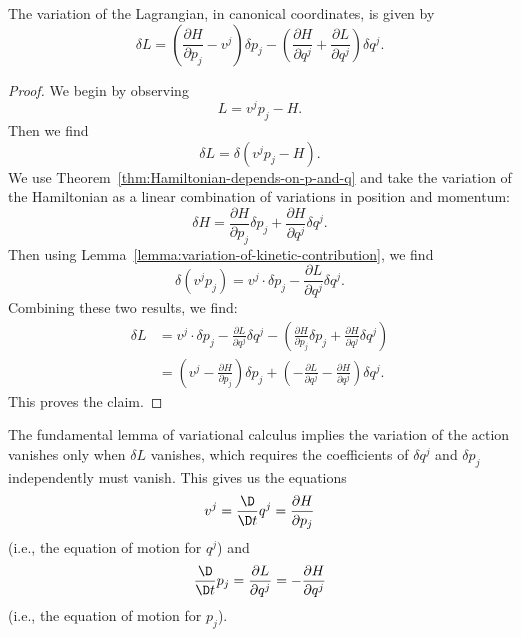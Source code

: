 \begin{theorem}
  The variation of the Lagrangian, in canonical coordinates, is given by
  \begin{equation}
\delta L = \left(\frac{\partial H}{\partial p_{j}}-v^{j}\right)\delta p_{j} -
\left(\frac{\partial H}{\partial q^{j}} + \frac{\partial L}{\partial q^{j}}\right)\delta q^{j}.
  \end{equation}
\end{theorem}

\begin{proof}
  We begin by observing
  \begin{equation}
L = v^{j}p_{j} - H.
  \end{equation}
  Then we find
  \begin{equation}
\delta L = \delta(v^{j}p_{j} - H).
  \end{equation}
  We use Theorem~\ref{thm:Hamiltonian-depends-on-p-and-q} and take the variation of the Hamiltonian as a linear combination of
  variations in position and momentum:
  \begin{equation}
\delta H = \frac{\partial H}{\partial p_{j}}\delta p_{j} +
\frac{\partial H}{\partial q^{j}}\delta q^{j}.
  \end{equation}
  Then using Lemma~\ref{lemma:variation-of-kinetic-contribution}, we find
  \begin{equation}
\delta(v^{j}p_{j}) =  v^{j}\cdot\delta p_{j} -\frac{\partial L}{\partial q^{j}}\delta q^{j}.
  \end{equation}
  Combining these two results, we find:
  \begin{subequations}
 \begin{align}
\delta L &= v^{j}\cdot\delta p_{j} -\frac{\partial L}{\partial
  q^{j}}\delta q^{j} - \left(\frac{\partial H}{\partial p_{j}}\delta p_{j} +
\frac{\partial H}{\partial q^{j}}\delta q^{j}\right)\\
&= \left(v^{j} - \frac{\partial H}{\partial p_{j}}\right)\delta p_{j} +
\left(-\frac{\partial L}{\partial q^{j}}-\frac{\partial H}{\partial q^{j}}\right)\delta q^{j}.
 \end{align}
  \end{subequations}
  This proves the claim.
\end{proof}


\begin{corollary}
The fundamental lemma of variational calculus implies the variation of
the action vanishes only when $\delta L$ vanishes, which requires the
coefficients of $\delta q^{j}$ and $\delta p_{j}$ independently must
vanish. This gives us the equations
\begin{equation}
v^{j} = \frac{\D}{\D t}q^{j} = \frac{\partial H}{\partial p_{j}}
\end{equation}
(i.e., the equation of motion for $q^{j}$) and
\begin{equation}
\frac{\D}{\D t}p_{j} = \frac{\partial L}{\partial q^{j}}=-\frac{\partial H}{\partial q^{j}}
\end{equation}
(i.e., the equation of motion for $p_{j}$).
\end{corollary}

